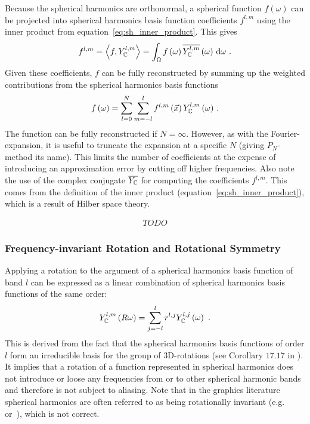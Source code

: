 Because the spherical harmonics are orthonormal, a spherical function $f\left(\omega\right)$ can be projected into spherical harmonics basis function coefficients $f^{l,m}$ using the inner product from equation~\ref{eq:sh_inner_product}. This gives
\begin{align}
\label{eq:sh_projection}
f^{l, m} = \left<f,Y_{\mathbb{C}}^{l, m}\right> = 
\int_\Omega f\left(\omega\right)\overline{Y_{\mathbb{C}}^{l,m}}\left(\omega\right)\,\mathrm{d}\omega
\ .
\end{align}
Given these coefficients, $f$ can be fully reconstructed by summing up the weighted contributions from the spherical harmonics basis functions
\begin{align}
\label{eq:sh_reconstruction}
f\left(\omega\right) = 
\sum_{l=0}^{N}
{
\sum_{m=-l}^{l}
{
f^{l,m}\left(\vec{x}\right)Y_{\mathbb{C}}^{l,m}\left(\omega\right)
}
}
\ .
\end{align}
The function can be fully reconstructed if $N=\infty$. However, as with the Fourier-expansion, it is useful to truncate the expansion at a specific $N$ (giving $P_N$-method its name). This limits the number of coefficients at the expense of introducing an approximation error by cutting off higher frequencies. Also note the use of the complex conjugate $\overline{Y_{\mathbb{C}}}$ for computing the coefficients $f^{l,m}$. This comes from the definition of the inner product (equation~\ref{eq:sh_inner_product}), which is a result of Hilber space theory.

\begin{align}
\label{eq:sh_projection_operator}
TODO
\end{align}

\subsubsection*{Frequency-invariant Rotation and Rotational Symmetry}

Applying a rotation to the argument of a spherical harmonics basis function of band $l$ can be expressed as a linear combination of spherical harmonics basis functions of the same order:
\begin{align}
\label{eq:sh_rotation}
Y_{\mathbb{C}}^{l,m}\left(R\omega\right)=\sum_{j=-l}^{l}r^{l,j}Y_{\mathbb{C}}^{l,j}\left(\omega\right)
\ .
\end{align}
This is derived from the fact that the spherical harmonics basis functions of order $l$ form an irreducible basis for the group of 3D-rotations (see Corollary $17.17$ in \cite{Hall13}). It implies that a rotation of a function represented in spherical harmonics does not introduce or loose any frequencies from or to other spherical harmonic bands and therefore is not subject to aliasing. Note that in the graphics literature spherical harmonics are often referred to as being rotationally invariant (e.g.~\cite{Wojciech08} or~\cite{Green03}), which is not correct.

